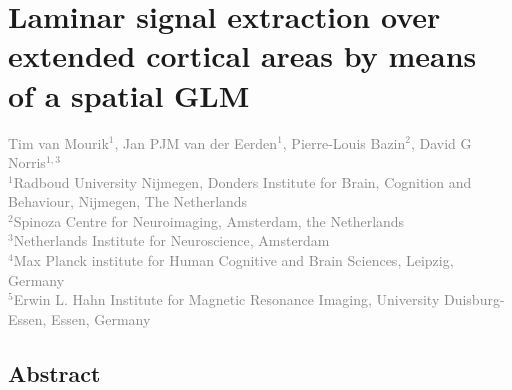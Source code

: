 
\chapter{Laminar signal extraction over extended cortical areas by means of a spatial GLM}
\label{ch:glm}

\textcolor{gray}{{Tim van Mourik$^{1}$}, Jan PJM van der Eerden$^{1}$, Pierre-Louis Bazin$^{2}$, David G Norris$^{1,3}$\\
$^{1}$Radboud University Nijmegen, Donders Institute for Brain, Cognition and Behaviour, Nijmegen, The Netherlands \\
$^{2}$Spinoza Centre for Neuroimaging, Amsterdam, the Netherlands \\
$^{3}$Netherlands Institute for Neuroscience, Amsterdam \\
$^{4}$Max Planck institute for Human Cognitive and Brain Sciences, Leipzig, Germany \\
$^{5}$Erwin L. Hahn Institute for Magnetic Resonance Imaging, University Duisburg-Essen, Essen, Germany}\\


\newpage
\section*{Abstract}

\newpage









